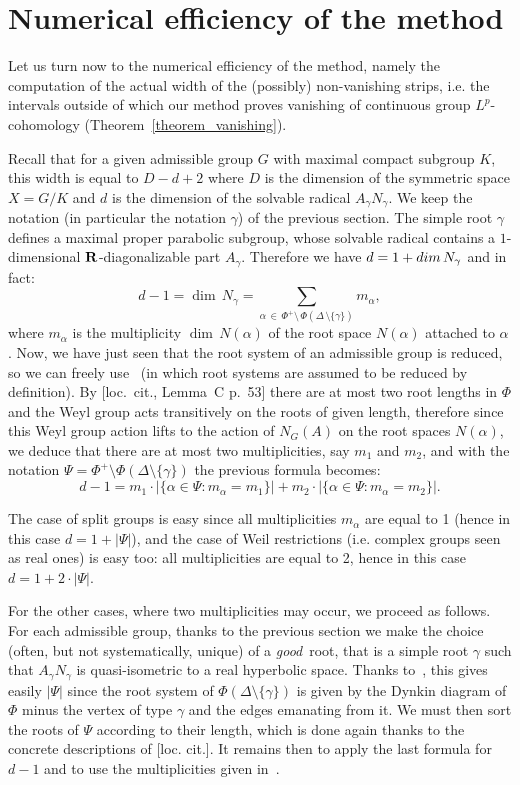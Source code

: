 \documentclass[11pt]{article}
\theoremstyle{definition}
\numberwithin{equation}{section}
\numberwithin{figure}{section}
\numberwithin{table}{section}
\begin{document}
\section{Numerical efficiency of the method}\label{8}

Let us turn now to the numerical efficiency of the method, namely the computation of the actual width of the (possibly) non-vanishing strips, i.e. the intervals outside of which our method proves vanishing of continuous group $L^p$-cohomology (Theorem~\ref{theorem_vanishing}).

Recall that for a given admissible group $G$ with maximal compact subgroup $K$, this width is equal to $D-d+2$ where $D$ is the dimension of the symmetric space $X=G/K$ and $d$ is the dimension of the solvable radical $A_\gamma N_\gamma$. We keep the notation (in particular the notation $\gamma$) of the previous section. The simple root $\gamma$ defines a maximal proper parabolic subgroup, whose solvable radical contains a $1$-dimensional ${\bf R}$-diagonalizable part $A_\gamma$. Therefore we have $d = 1 + {\rm dim} \, N_\gamma$ and in fact:
\[
d-1 = {\dim} \, N_\gamma = \sum_{\alpha\,\in\, \Phi^+ \setminus\,\Phi(\Delta\,\setminus \{ \gamma \})}m_\alpha,
\]
where $m_\alpha$ is the multiplicity ${\dim} \, N(\alpha)$ of the root space $N(\alpha)$ attached to $\alpha$. Now, we have just seen that the root system of an admissible group is reduced, so we can freely use~\cite{Humphreys-LA} (in which root systems are assumed to be reduced by definition). By [loc.~cit., Lemma~C p.~53] there are at most two root lengths in $\Phi$ and the Weyl group acts transitively on the roots of given length, therefore since this Weyl group action lifts to the action of $N_G(A)$ on the root spaces $N(\alpha)$, we deduce that there are at most two multiplicities, say $m_1$ and $m_2$, and with the notation $\Psi = \Phi^+ \setminus \Phi(\Delta \setminus \{ \gamma \})$ the previous formula becomes:
\[
d-1 =
m_1 \cdot | \{\alpha \in \Psi : m_\alpha = m_1 \}| +
m_2 \cdot | \{\alpha \in \Psi : m_\alpha = m_2 \}|.
\]

The case of split groups is easy since all multiplicities $m_\alpha$ are equal to 1 (hence in this case $d=1 + |\Psi|$), and the case of Weil restrictions (i.e. complex groups seen as real ones) is easy too: all multiplicities are equal to 2, hence in this case $d=1 + 2 \cdot |\Psi|$.

For the other cases, where two multiplicities may occur, we proceed as follows. For each admissible group, thanks to the previous section we make the choice (often, but not systematically, unique) of a \emph{good}~root, that is a simple root $\gamma$ such that $A_\gamma N_\gamma$ is quasi-isometric to a real hyperbolic space. Thanks to~\cite[Planches]{BBK-Lie-4to6}, this gives easily $|\Psi|$ since the root system of $\Phi(\Delta \setminus \{ \gamma \})$ is given by the Dynkin diagram of $\Phi$ minus the vertex of type $\gamma$ and the edges emanating from it. We must then sort the roots of $\Psi$ according to their length, which is done again thanks to the concrete descriptions of [loc. cit.]. It remains then to apply the last formula for $d-1$ and to use the multiplicities given in~\cite[Table~VI, pp.~532--534]{Helgason}.
\end{document}
